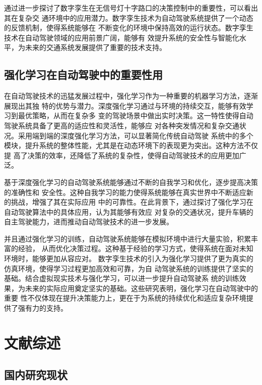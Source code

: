 通过进一步探讨了数字孪生在无信号灯十字路口的决策控制中的重要性，可以看出其在复杂交
通环境中的应用潜力。数字孪生技术为自动驾驶系统提供了一个动态的反馈机制，使得系统能够在
不断变化的环境中保持高效的运行状态。数字孪生技术在自动驾驶领域的应用前景广阔，能够有
效提升系统的安全性与智能化水平，为未来的交通系统发展提供了重要的技术支持。

\subsection{强化学习在自动驾驶中的重要性用}

在自动驾驶技术的迅猛发展过程中，强化学习作为一种重要的机器学习方法，逐渐展现出其独
特的优势与潜力。深度强化学习通过与环境的持续交互，能够有效学习到最优策略，从而在复杂多
变的驾驶场景中做出实时决策。这一特性使得自动驾驶系统具备了更高的适应性和灵活性，能够应
对各种突发情况和复杂交通状况\cite{韩胜明2023深度强化学习在自动驾驶系统中的应用综述}。采用端到端的深度强化学习方法，可以显著简化传统自动驾驶
系统中的多个模块，提升系统的整体性能，尤其是在动态环境下的表现更为突出。这种方法不仅提
高了决策的效率，还降低了系统的复杂性，使得自动驾驶技术的应用更加广泛\cite{魏兆吉2021端到端免模型深度强化学习在自动驾驶中的应用研究}。

基于深度强化学习的自动驾驶系统能够通过不断的自我学习和优化，逐步提高决策的准确性和
安全性。这种自我学习的能力使得系统能够在真实世界中不断适应新的挑战，增强了其在实际应用
中的可靠性。在此背景下，通过探讨了强化学习在自动驾驶算法中的具体应用，认为其能够有效应
对复杂的交通状况，提升车辆的自主驾驶能力，进而推动自动驾驶技术的进一步发展。

并且通过强化学习的训练，自动驾驶系统能够在模拟环境中进行大量实验，积累丰富的经验，
从而优化决策过程。这种基于经验的学习方式，使得系统在面对未知环境时，能够更加从容应对。
数字孪生技术的引入为强化学习提供了更为真实的仿真环境，使得学习过程更加高效和可靠，为自
动驾驶系统的训练提供了坚实的基础\cite{梁恩云2022面向自动驾驶仿真测试的数字孪生场景交互研究与实现}。结合虚拟现实技术与强化学习，可以进一步提升自动驾驶系
统的训练效果，为未来的实际应用奠定坚实的基础。这些研究表明，强化学习在自动驾驶中的重要
性不仅体现在提升决策能力上，更在于为系统的持续优化和适应复杂环境提供了强有力的支持。

\section{文献综述}

\subsection{国内研究现状}

